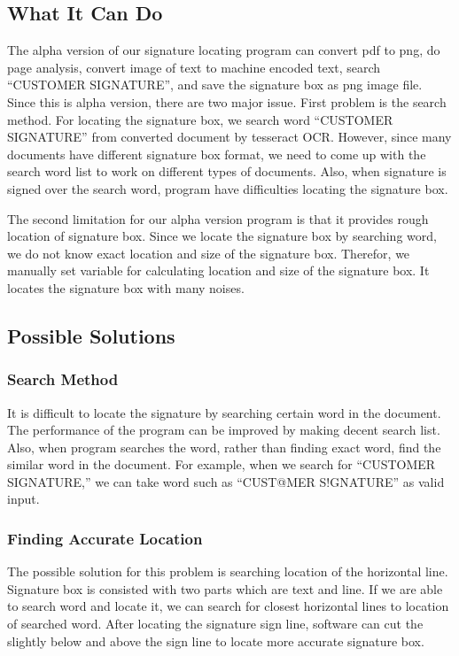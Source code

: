 \documentclass[onecolumn, draftclsnofoot,10pt, compsoc]{IEEEtran}
\begin{document}
\subsection{What It Can Do}
The alpha version of our signature locating program can convert pdf to png, do page analysis, convert image of text to machine encoded text, search “CUSTOMER SIGNATURE”, and save the signature box as png image file. Since this is alpha version, there are two major issue. First problem is the search method. For locating the signature box, we search word “CUSTOMER SIGNATURE” from converted document by tesseract OCR. However, since many documents have different signature box format, we need to come up with the search word list to work on different types of documents. Also, when signature is signed over the search word, program have difficulties locating the signature box.

The second limitation for our alpha version program is that it provides rough location of signature box. Since we locate the signature box by searching word, we do not know exact location and size of the signature box. Therefor, we manually set variable for calculating location and size of the signature box. It locates the signature box with many noises.

\subsection{Possible Solutions}
\subsubsection{Search Method}
It is difficult to locate the signature by searching certain word in the document. The performance of the program can be improved by making decent search list. Also, when program searches the word, rather than finding exact word, find the similar word in the document. For example, when we search for “CUSTOMER SIGNATURE,” we can take word such as “CUST@MER S!GNATURE” as valid input.

\subsubsection{Finding Accurate Location}
The possible solution for this problem is searching location of the horizontal line. Signature box is consisted with two parts which are text and line. If we are able to search word and locate it, we can search for closest horizontal lines to location of searched word. After locating the signature sign line, software can cut the slightly below and above the sign line to locate more accurate signature box.
\end{document}
